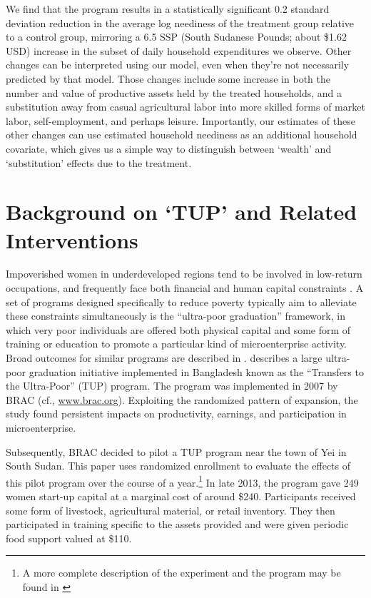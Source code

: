 \documentclass[11pt]{article}
\begin{document}
We find that the program results in a statistically significant 0.2
standard deviation reduction in the average log neediness of the
treatment group relative to a control group, mirroring a 6.5 SSP
(South Sudanese Pounds; about \$1.62 USD) increase in the subset 
of daily household expenditures we observe.  Other changes
can be interpreted using our model, even when they're not
necessarily predicted by that model.  Those changes include some
increase in both the number and value of productive assets held by
the treated households, and a substitution away from casual
agricultural labor into more skilled forms of market labor,
self-employment, and perhaps leisure.  Importantly, our estimates of
these other changes can use estimated household neediness as an
additional household covariate, which gives us a simple way to
distinguish between `wealth' and `substitution' effects due to the
treatment.

\section*{Background on `TUP' and Related Interventions}
\label{sec-2}

Impoverished women in underdeveloped regions tend to be involved in
low-return occupations, and frequently face both financial and human
capital constraints \citep{duflo2007}. A set of programs designed specifically
to reduce poverty typically aim to alleviate these constraints simultaneously is the ``ultra-poor graduation''
framework, in which very poor individuals are offered both physical
capital and some form of training or education to promote a particular
kind of microenterprise activity. Broad outcomes for similar programs are described in
\citep{banerjee2015}.  \cite{bandiera2017} describes a
large ultra-poor graduation initiative implemented in Bangladesh known
as the ``Transfers to the Ultra-Poor'' (TUP) program. The program was
implemented in 2007 by BRAC (cf., \url{www.brac.org}). Exploiting
the randomized pattern of expansion, the study found persistent
impacts on productivity, earnings, and participation in
microenterprise.

Subsequently, BRAC decided to pilot a TUP program near the town of
Yei in South Sudan.  This paper uses randomized enrollment to evaluate the
effects of this pilot program over the course of a year.\footnote{A more complete description
  of the experiment and the program may be found in
  \cite{Chowdhury-etal15}} In late 2013, the program gave 249 women
start-up capital at a marginal cost of around \$240. Participants
received some form of livestock, agricultural material, or retail
inventory. They then participated in training specific to the
assets provided and were given periodic food support valued at \$110.
\end{document}
